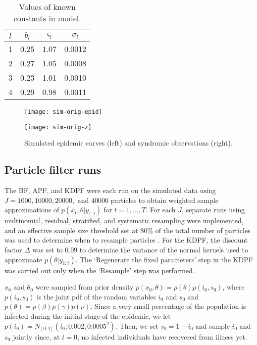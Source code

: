 \documentclass{elsarticle}
\begin{document}
\begin{table}[ht]
\begin{center}
\caption{Values of known constants in model.}
\label{tab:constants}
\begin{tabular}{|cccc|}
\hline
$l$ & $b_l$ & $\varsigma_l$ & $\sigma_l$ \\
\hline
1 & 0.25 & 1.07 & 0.0012 \\
2 & 0.27 & 1.05 & 0.0008 \\
3 & 0.23 & 1.01 & 0.0010 \\
4 & 0.29 & 0.98 & 0.0011 \\
\hline
\end{tabular}
\end{center}
\end{table}

\begin{figure}
\centering
\begin{minipage}{0.48\linewidth}
\texttt{[image: sim-orig-epid]}
\end{minipage}
\begin{minipage}{0.48\linewidth}
\texttt{[image: sim-orig-z]}
\end{minipage}
\caption{Simulated epidemic curves (left) and syndromic observations (right).} \label{fig:data}
\end{figure}

\subsection{Particle filter runs} \label{sec:pf}

The BF, APF, and KDPF were each run on the simulated data using $J = 1000, 10000, 20000, \mbox{ and } 40000$ particles to obtain weighted sample approximations of $p(x_t,\theta|y_{1:t})$ for $t = 1,\ldots,T$. For each $J$, separate runs using multinomial, residual, stratified, and systematic resampling were implemented, and an effective sample size threshold set at 80\% of the total number of particles was used to determine when to resample particles \citep{Liu:Chen:Wong:reje:1998}. For the KDPF, the discount factor $\Delta$ was set to 0.99 to determine the variance of the normal kernels used to approximate $p(\theta|y_{1:t})$. The `Regenerate the fixed parameters' step in the KDPF was carried out only when the `Resample' step was performed.

$x_0$ and $\theta_0$ were sampled from prior density $p(x_0,\theta) = p(\theta)p(i_0,s_0)$, where $p(i_0,s_0)$ is the joint pdf of the random variables $i_0$ and $s_0$ and $p(\theta) = p(\beta)p(\gamma)p(\nu)$. Since a very small percentage of the population is infected during the initial stage of the epidemic, we let $p(i_0) = N_{[0,1]}(i_0;0.002,0.0005^2)$. Then, we set $s_0 = 1 - i_0$ and sample $i_0$ and $s_0$ jointly since, at $t = 0$, no infected individuals have recovered from illness yet.
\end{document}

